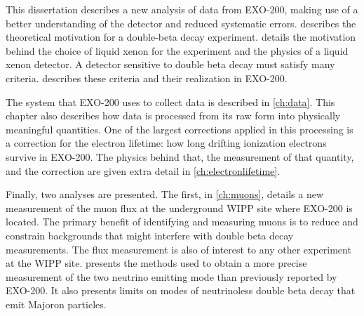 \documentclass[herrin-thesis.tex]{subfiles}
\begin{document}
This dissertation describes a new analysis of data from EXO-200, making use of a better understanding of the detector and reduced systematic errors.  describes the theoretical motivation for a double-beta decay experiment.  details the motivation behind the choice of liquid xenon for the experiment and the physics of a liquid xenon detector. A detector sensitive to double beta decay must satisfy many criteria.  describes these criteria and their realization in EXO-200.

The system that EXO-200 uses to collect data is described in \cref{ch:data}. This chapter also describes how data is processed from its raw form into physically meaningful quantities. One of the largest corrections applied in this processing is a correction for the electron lifetime: how long drifting ionization electrons survive in EXO-200. The physics behind that, the measurement of that quantity, and the correction are given extra detail in \cref{ch:electronlifetime}.

Finally, two analyses are presented. The first, in \cref{ch:muons}, details a new measurement of the muon flux at the underground WIPP site where EXO-200 is located. The primary benefit of identifying and measuring muons is to reduce and constrain backgrounds that might interfere with double beta decay measurements. The flux measurement is also of interest to any other experiment at the WIPP site.  presents the methods used to obtain a more precise measurement of the two neutrino emitting mode than previously reported by EXO-200. It also presents limits on modes of neutrinoless double beta decay that emit Majoron particles.
\end{document}
